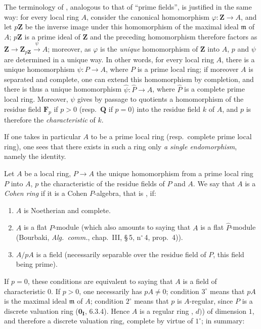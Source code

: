 The terminology of , analogous to that of ``prime fields'', is justified in the same way: for every local ring $A$, consider the canonical homomorphism $\varphi:\mathbf{Z}\to A$, and let $p\mathbf{Z}$ be the inverse image under this homomorphism of the maximal ideal $\mathfrak{m}$ of $A$; $p\mathbf{Z}$ is a prime ideal of $\mathbf{Z}$ and the preceding homomorphism therefore factors as $\mathbf{Z}\to\mathbf{Z}_{p\mathbf{Z}}\xrightarrow{\psi}A$; moreover, as $\varphi$ is the \emph{unique} homomorphism of $\mathbf{Z}$ into $A$, $p$ and $\psi$ are determined in a unique way.
In other words, for every local ring $A$, there is a unique homomorphism $\psi:P\to A$, where $P$ is a prime local ring; if moreover $A$ is separated and complete, one can extend this homomorphism by completion, and there is thus a unique homomorphism $\hat{\psi}:\widehat{P}\to A$, where $\widehat{P}$ is a complete prime local ring.
Moreover, $\psi$ gives by passage to quotients a homomorphism of the residue field $\mathbf{F}_p$ if $p>0$ (resp.\ $\mathbf{Q}$ if $p=0$) into the residue field $k$ of $A$, and $p$ is therefore the \emph{characteristic} of $k$.

If one takes in particular $A$ to be a prime local ring (resp.\ complete prime local ring), one sees that there exists in such a ring only \emph{a single endomorphism}, namely the identity.

\begin{definition}[19.8.4]
\label{0.19.8.4}
Let $A$ be a local ring, $P\to A$ the unique homomorphism from a prime local ring $P$ into $A$, $p$ the characteristic of the residue fields of $P$ and $A$.
We say that $A$ is a \emph{Cohen ring} if it is a Cohen $P$-algebra, that is , if:
\begin{enumerate}
  \item[$1^\circ$] $A$ is Noetherian and complete.
  \item[$2^\circ$] $A$ is a flat $P$-module (which also amounts to saying that $A$ is a flat $\widehat{P}$-module (Bourbaki, \emph{Alg.\ comm.}, chap.~III, \S\,5, n$^\circ$\,4, prop.~4)).
  \item[$3^\circ$] $A/pA$ is a field (necessarily separable over the residue field of $P$, this field being prime).
\end{enumerate}
\end{definition}

If $p=0$, these conditions are equivalent to saying that $A$ is a field of characteristic $0$.
If $p>0$, one necessarily has $pA\neq 0$; condition $3^\circ$ means that $pA$ is the maximal ideal $\mathfrak{m}$ of $A$; condition $2^\circ$ means that $p$ is $A$-regular, since $P$ is a discrete valuation ring ($\mathbf{0_I}$, 6.3.4).
Hence $A$ is a regular ring , $d)$) of dimension $1$, and therefore a discrete valuation ring, complete by virtue of $1^\circ$; in summary:

